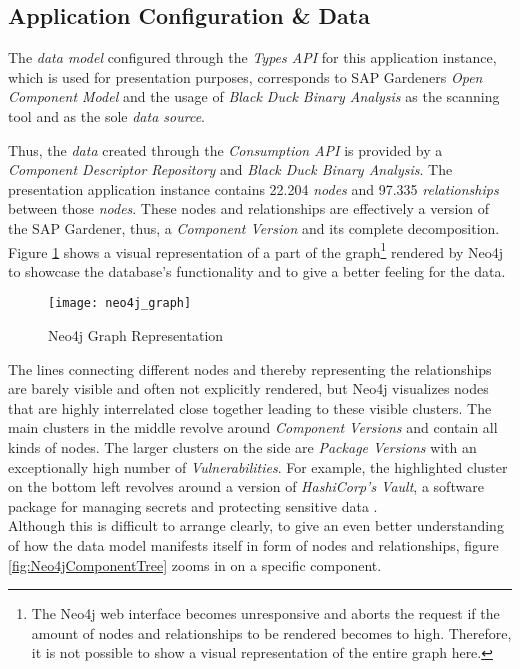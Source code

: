 \subsection{Application Configuration \& Data}
The \emph{data model} configured through the \emph{Types API} for this application instance, which is used for presentation purposes, corresponds to SAP Gardeners \emph{Open Component Model} and the usage of \emph{Black Duck Binary Analysis} as the scanning tool and as the sole \emph{data source}.\par
Thus, the \emph{data} created through the \emph{Consumption API} is provided by a \emph{Component Descriptor Repository} and \emph{Black Duck Binary Analysis}. The presentation application instance contains 22.204 \emph{nodes} and 97.335 \emph{relationships} between those \emph{nodes}. These nodes and relationships are effectively a version of the SAP Gardener, thus, a \emph{Component Version} and its complete decomposition. Figure \ref{fig:Neo4jGraph} shows a visual representation of a part of the graph\footnote{The Neo4j web interface becomes unresponsive and aborts the request if the amount of nodes and relationships to be rendered becomes to high. Therefore, it is not possible to show a visual representation of the entire graph here.} rendered by Neo4j to showcase the database's functionality and to give a better feeling for the data.\par

\begin{figure}[H]
	\centering
	\texttt{[image: neo4j\_graph]}
	\caption[Neo4j Graph]{Neo4j Graph Representation }
	\label{fig:Neo4jGraph}
\end{figure}

The lines connecting different nodes and thereby representing the relationships are barely visible and often not explicitly rendered, but Neo4j visualizes nodes that are highly interrelated close together leading to these visible clusters. The main clusters in the middle revolve around \emph{Component Versions} and contain all kinds of nodes. The larger clusters on the side are \emph{Package Versions} with an exceptionally high number of \emph{Vulnerabilities}. For example, the highlighted cluster on the bottom left revolves around a version of \emph{HashiCorp's Vault}, a software package for managing secrets and protecting sensitive data \cite{vault}.\\

Although this is difficult to arrange clearly, to give an even better understanding of how the data model manifests itself in form of nodes and relationships, figure \ref{fig:Neo4jComponentTree} zooms in on a specific component.

